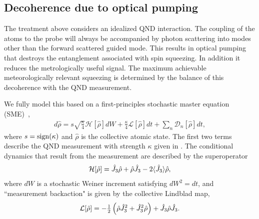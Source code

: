 \documentclass[preprint,aps,pra,onecolumn]{revtex4-1} %
\newcommand{\jz}{\hat{J}_3}
\begin{document}
	\subsection{Decoherence due to optical pumping}

The treatment above considers an idealized QND interaction. The coupling of the atoms to the probe will always be accompanied by photon scattering into modes other than the forward scattered guided mode.  This results in optical pumping that destroys the entanglement associated with spin squeezing.  In addition it reduces the metrologically useful signal.  The maximum achievable meteorologically relevant squeezing is determined by the balance of this decoherence with the QND measurement. 

We fully model this based on a first-principles stochastic master equation (SME)~\cite{?},
	\begin{align} \label{Eq::SME}
		d \hat{\rho} = s\sqrt{\frac{\kappa}{4}} \mathcal{H}[\hat{\rho}] dW + \frac{\kappa}{4} \mathcal{L}[\hat{\rho}] dt + \sum_n \mathcal{D}_n [\hat{\rho}] dt,
	\end{align}
where $s = {\rm sign}(\kappa)$ and $\hat{\rho}$ is the collective atomic state. The first two terms describe the QND measurement with strength $\kappa$ given in . The conditional dynamics that result from the measurement are described by the superoperator
	\begin{align}
		\mathcal{H}[\hat{\rho}] = \jz \hat{\rho} + \hat{\rho} \jz - 2 \expt{\jz} \hat{\rho},
	\end{align}
where $dW$ is a stochastic Weiner increment satisfying $dW^2 = dt$, and ``measurement backaction" is given by the collective Lindblad map, 
	\begin{align}
		\mathcal{L}[\hat{\rho}] = - \smallfrac{1}{2}  \left(\hat{\rho}  \jz^2 + \jz^2 \hat{\rho}\right) + \jz \hat{\rho} \jz.
	\end{align}
\end{document}
